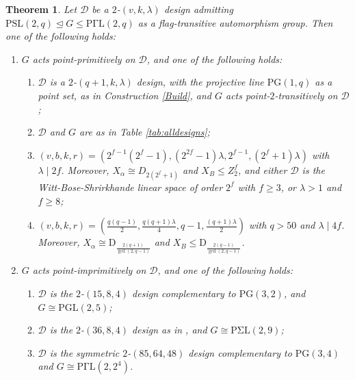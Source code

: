 \documentclass[a4paper,twopage,reqno,12pt]{amsart}
\newtheorem{theorem}{Theorem}[section]
\theoremstyle{definition}
\numberwithin{equation}{section}
\newcommand{\PSL}{\mathrm{PSL}}
\newcommand{\PGL}{\mathrm{PGL}}
\newcommand{\PGaL}{\mathrm{P\Gamma L}}
\newcommand{\PSigL}{\mathrm{P\Sigma L}}
\newcommand{\D}{\mathrm{D}}
\newcommand{\PG}{\mathrm{PG}}
\renewcommand{\leq}{\leqslant}
\renewcommand{\geq}{\geqslant}
\begin{document}
\begin{theorem}\label{main}
Let $\mathcal{D}$ be a $2$-$(v,k,\lambda)$ design admitting $\PSL(2,q) \unlhd G\leq \PGaL(2,q)$ as a flag-transitive automorphism group. Then one of the following holds:
\begin{enumerate}
    \item $G$ acts point-primitively on $\mathcal{D}$, and one of the following holds:
\begin{enumerate}
    \item $\mathcal{D}$ is a $2$-$(q+1,k,\lambda)$ design, with the projective line $\PG(1,q)$ as a point set, as in Construction \ref{Build}, and $G$ acts point-$2$-transitively on $\mathcal{D}$; 
    \item $\mathcal{D}$ and $G$ are as in Table \ref{tab:alldesigns};
    \item$\left(v,b,k,r\right)=\left(2^{f-1}(2^{f}-1),(2^{2f}-1)\lambda,2^{f-1},(2^{f}+1)\lambda\right)$ with $\lambda \mid 2f$. Moreover, $X_{\alpha}\cong D_{2(2^f+1)}$ and $X_{B}\leq Z^{f}_{2}$, and either $\mathcal{D}$ is the Witt-Bose-Shrirkhande linear space of order $2^{f}$ with $f\geq 3$, or $\lambda>1$ and $f \geq 8$;
    \item $\left(v,b,k,r\right)=\left(\frac{q(q-1)}{2},\frac{q(q+1)\lambda}{4},q-1,\frac{(q+1)\lambda}{2}\right)$ with $q>50$ and $\lambda \mid 4f$. Moreover, $X_{\alpha}\cong \D_{\frac{2(q+1)}{\gcd(2,q-1)}}$ and $X_{B}\leq \D_{\frac{2(q-1)}{\gcd(2,q-1)}}$.
\end{enumerate}
\item $G$ acts point-imprimitively on $\mathcal{D}$, and one of the following holds:
\begin{enumerate}
\item $\mathcal{D}$ is the $2$-$(15,8,4)$ design complementary to $\PG(3,2)$, and $ G\cong
\PGL(2,5)$;
\item $\mathcal{D}$ is the $2$-$(36,8,4)$ design as in \cite[Construction 9]{DP}, and $G\cong \PSigL(2,9)$;
\item $\mathcal{D}$ is the symmetric $2$-$(85,64,48)$ design complementary to $\PG(3,4)$ and $G\cong \PGaL (2,2^4)$.
\end{enumerate}
\end{enumerate}
\end{theorem}
\end{document}
